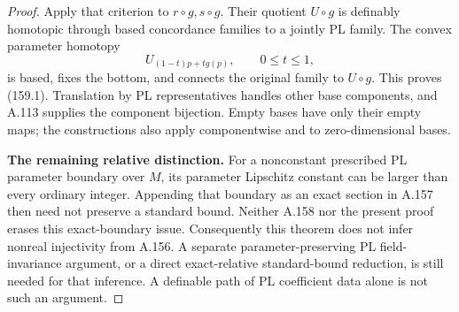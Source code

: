 \begin{proof}
Apply that criterion to $r\circ g,s\circ g$. Their quotient
$U\circ g$ is definably homotopic through based concordance
families to a jointly PL family. The convex parameter homotopy
\[
 U_{(1-t)p+t g(p)},\qquad 0\le t\le1,
 \tag{159.11}
\]
is based, fixes the bottom, and connects the original family
to $U\circ g$. This proves (159.1). Translation by PL
representatives handles other base components, and A.113
supplies the component bijection. Empty bases have only their
empty maps; the constructions also apply componentwise and
to zero-dimensional bases.

\textbf{The remaining relative distinction.}\quad
For a nonconstant prescribed PL parameter boundary over $M$,
its parameter Lipschitz constant can be larger than every
ordinary integer. Appending that boundary as an exact section
in A.157 then need not preserve a standard bound. Neither
A.158 nor the present proof erases this exact-boundary issue.
Consequently this theorem does not infer nonreal injectivity
from A.156. A separate parameter-preserving PL field-invariance
argument, or a direct exact-relative standard-bound reduction,
is still needed for that inference. A definable path of PL
coefficient data alone is not such an argument.
\end{proof}



